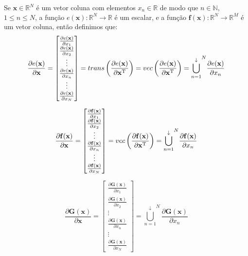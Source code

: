 \begin{definition}\label{def:deltaver}
Se 
$\mathbf{x}\in \mathbb{R}^N$ é um vetor coluna com elementos $x_n\in \mathbb{R}$ de modo que
$n\in \mathbb{N}$, $1 \leq n \leq N$, 
a função $e(\mathbf{x}): \mathbb{R}^N \rightarrow \mathbb{R}$ é um escalar, e
a função $\mathbf{f}(\mathbf{x}): \mathbb{R}^N \rightarrow \mathbb{R}^M$ é um vetor coluna, 
então definimos que:
\begin{equation}
\frac{\partial e(\mathbf{x}) }{\partial \mathbf{x}}= 
\left[
\begin{matrix}
\frac{\partial e(\mathbf{x}) }{\partial x_{1}} \\
\frac{\partial e(\mathbf{x}) }{\partial x_{2}} \\
\vdots \\
\frac{\partial e(\mathbf{x}) }{\partial x_{n}} \\
\vdots \\
\frac{\partial e(\mathbf{x}) }{\partial x_{N}} 
\end{matrix}
\right] = trans \left( \frac{\partial e(\mathbf{x}) }{\partial \mathbf{x}^{\mathrm{T}}} \right) =
vec \left( \frac{\partial e(\mathbf{x}) }{\partial \mathbf{x}^{\mathrm{T}}} \right) =
{\bigcup\limits_{n=1}^{\downarrow}}^{N}{\frac{\partial e(\mathbf{x}) }{\partial x_{n}}} 
\end{equation}

\begin{equation}
\frac{\partial \mathbf{f}(\mathbf{x}) }{\partial \mathbf{x}}= 
\left[
\begin{matrix}
\frac{\partial \mathbf{f}(\mathbf{x}) }{\partial x_{1}} \\
\frac{\partial \mathbf{f}(\mathbf{x}) }{\partial x_{2}} \\
\vdots \\
\frac{\partial \mathbf{f}(\mathbf{x}) }{\partial x_{n}} \\
\vdots \\
\frac{\partial \mathbf{f}(\mathbf{x}) }{\partial x_{N}}
\end{matrix}
\right] =  vec \left( \frac{\partial \mathbf{f}(\mathbf{x}) }{\partial \mathbf{x}^{\mathrm{T}}} \right) =
{\bigcup\limits_{n=1}^{\downarrow}}^{N}{\frac{\partial \mathbf{f}(\mathbf{x}) }{\partial x_{n}}}
\end{equation}

\begin{equation}
\frac{\partial \mathbf{G}(\mathbf{x}) }{\partial \mathbf{x}}= 
\left[
\begin{matrix}
\frac{\partial \mathbf{G}(\mathbf{x}) }{\partial x_{1}} \\
\frac{\partial \mathbf{G}(\mathbf{x}) }{\partial x_{2}} \\
\vdots \\
\frac{\partial \mathbf{G}(\mathbf{x}) }{\partial x_{n}} \\
\vdots \\
\frac{\partial \mathbf{G}(\mathbf{x}) }{\partial x_{N}}
\end{matrix}
\right] = {\bigcup\limits_{n=1}^{\downarrow}}^{N}{\frac{\partial \mathbf{G}(\mathbf{x}) }{\partial x_{n}}}
\end{equation}
\end{definition}
